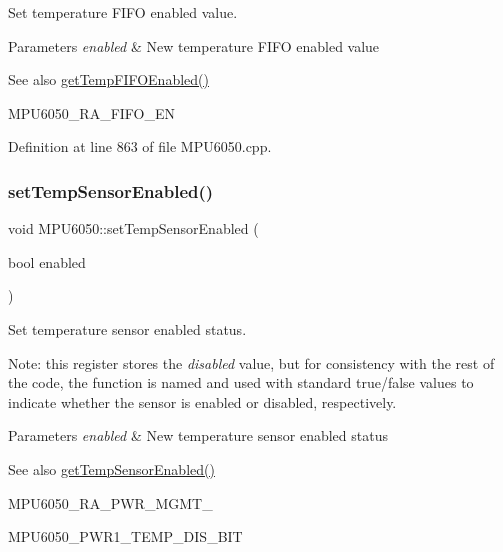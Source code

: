 Set temperature F\+I\+FO enabled value. 


\begin{DoxyParams}{Parameters}
{\em enabled} & New temperature F\+I\+FO enabled value \\
\hline
\end{DoxyParams}
\begin{DoxySeeAlso}{See also}
\mbox{\hyperlink{classMPU6050_a913c2095001e204b5b09f8382a86d2ca}{get\+Temp\+F\+I\+F\+O\+Enabled()}} 

M\+P\+U6050\+\_\+\+R\+A\+\_\+\+F\+I\+F\+O\+\_\+\+EN 
\end{DoxySeeAlso}


Definition at line 863 of file M\+P\+U6050.\+cpp.

\mbox{\label{classMPU6050_a0113871802e88c80fe69ce1f607987ff}} 
\subsubsection{\texorpdfstring{setTempSensorEnabled()}{setTempSensorEnabled()}}
{\footnotesize\ttfamily void M\+P\+U6050\+::set\+Temp\+Sensor\+Enabled (\begin{DoxyParamCaption}\item[{bool}]{enabled }\end{DoxyParamCaption})}



Set temperature sensor enabled status. 

Note\+: this register stores the {\itshape disabled} value, but for consistency with the rest of the code, the function is named and used with standard true/false values to indicate whether the sensor is enabled or disabled, respectively.


\begin{DoxyParams}{Parameters}
{\em enabled} & New temperature sensor enabled status \\
\hline
\end{DoxyParams}
\begin{DoxySeeAlso}{See also}
\mbox{\hyperlink{classMPU6050_a31f588beab6760258212c65725eba336}{get\+Temp\+Sensor\+Enabled()}} 

M\+P\+U6050\+\_\+\+R\+A\+\_\+\+P\+W\+R\+\_\+\+M\+G\+M\+T\+\_ 

M\+P\+U6050\+\_\+\+P\+W\+R1\+\_\+\+T\+E\+M\+P\+\_\+\+D\+I\+S\+\_\+\+B\+IT 
\end{DoxySeeAlso}


